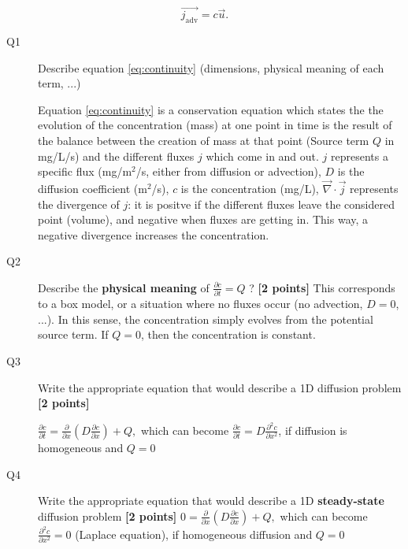 \documentclass{article}
\newcommand{\ans}[1]{\textcolor{dark-green}{#1}}
\begin{document}
\begin{equation}
\overrightarrow{j_{\mathrm{adv}}} = c \overrightarrow{u} . \label{eq:adv}
\end{equation}
\begin{description}
\item [Q1] Describe equation \ref{eq:continuity} (dimensions, physical meaning of each term, ...) 

\ans{Equation \ref{eq:continuity} is a conservation equation which states the the evolution of the concentration (mass) at one point in time is the result of the balance between the creation of mass at that point (Source term $Q$ in mg/L/s) and the different fluxes $j$ which come in and out. $j$ represents a specific flux (mg/m$^2$/s, either from diffusion or advection), $D$ is the diffusion coefficient (m$^2$/s), $c$ is the concentration (mg/L), $\overrightarrow{\nabla} \cdot \overrightarrow{j}$ represents the divergence of $j$: it is positve if the different fluxes leave the considered point (volume), and negative when fluxes are getting in. This way, a negative divergence increases the concentration.}

\end{description}


\begin{description}
\item [Q2] Describe the \textbf{physical meaning} of $ \frac{\partial c}{\partial t}  = Q$ ? \textbf{[2 points]}
\ans{This corresponds to a box model, or a situation where no fluxes occur (no advection, $D = 0$, ...). In this sense, the concentration simply evolves from the potential source term. If $Q = 0$, then the concentration is constant.}

\item [Q3] Write the appropriate equation that would describe a 1D diffusion problem \textbf{[2 points]}

\ans{$\frac{\partial c}{\partial t} = \frac{\partial}{\partial x} \left( D \frac{\partial c}{\partial x}  \right) + Q, $ which can become $\frac{\partial c}{\partial t} = D  \frac{\partial^2 c}{\partial x^2} $, if diffusion is homogeneous and $Q = 0$ }
\item [Q4] Write the appropriate equation that would describe a 1D \textbf{steady-state} diffusion problem \textbf{[2 points]}
\ans{$0 = \frac{\partial}{\partial x} \left( D \frac{\partial c}{\partial x}  \right) + Q, $ which can become $ \frac{\partial^2 c}{\partial x^2} = 0 $ (Laplace equation), if homogeneous diffusion and $Q = 0$ }
\end{description}
\end{document}
